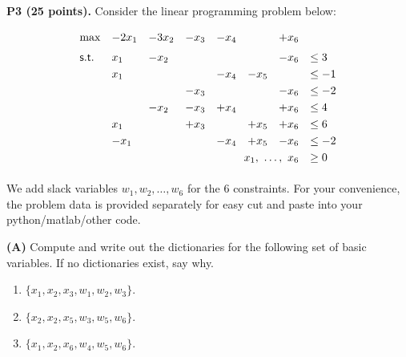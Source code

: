 \documentclass[11pt]{article}
\begin{document}
\begin{figure}[H]
\centering
\end{figure}

\newpage

\noindent\textbf{P3 (25 points).} Consider the linear programming problem below:

\[ \begin{array}{llllllllll}
\max & -2 x_1 & - 3 x_2 & - x_3 & - x_4 &  & + x_6 \\[6pt]
\mathsf{s.t.} & x_1 & - x_2 &   &   &  & - x_6 & \leq 3\\[3pt]
&  x_1 &    &     &    -x_4 &   -x_5  &  & \leq -1 \\[3pt]
&  &  & - x_3 & & & - x_6 & \leq -2 \\[3pt]
&  & -x_2 & -x_3 & + x_4 & & + x_6 & \leq 4\\[3pt]
& x_1 & & + x_3 & & + x_5 & + x_6 & \leq 6\\[3pt]
& -x_1 & &  & -x_4 & + x_5 & - x_6 & \leq -2 \\[3pt]
& \multicolumn{6}{r}{x_1,\ \ldots,\ x_6} & \geq 0\\[3pt]
\end{array}\]

We add slack variables $w_1, w_2, \ldots, w_6$ for the $6$
constraints. For your convenience, the problem data is provided
separately for easy cut and paste into your python/matlab/other code.

\noindent\textbf{(A)} Compute and write out the 
dictionaries for the following
set of basic variables. If no dictionaries exist, say why.

\begin{enumerate}
\item $\{ x_1, x_2, x_3, w_1, w_2, w_3 \}$.
\item $\{ x_2, x_2, x_5, w_3, w_5, w_6 \}$.
\item $\{x_1, x_2, x_6, w_{4}, w_5, w_6 \}$.
\end{enumerate}
\end{document}
